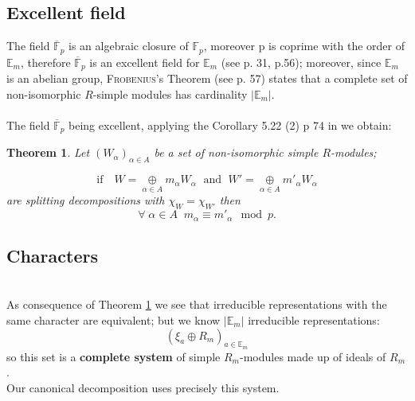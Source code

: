 \documentclass[preprint,12pt,authoryear]{elsarticle}
\newtheorem{thm}{Theorem}[section]
\theoremstyle{definition}
\begin{document}

\subsection{Excellent field}
The field $\overline{\mathbb{F}}_p$ is an algebraic closure of $\mathbb{F}_p$, moreover p is coprime with the
 order of $\mathbb{E}_m$, therefore $\overline{\mathbb{F}}_p$ is an excellent field for $\mathbb{E}_m$ (see \cite{weintraub} p. 31, p.56); moreover, since $\mathbb{E}_m$ is an abelian group, \textsc{Frobenius}'s Theorem (see \cite{weintraub}  p. 57) states that a complete set of non-isomorphic $R$-simple modules has cardinality $|\mathbb{E}_m|$.\\\\

\noindent  The field $\overline{\mathbb{F}}_p$  being excellent, applying the  Corollary 5.22 (2) p 74  in \cite{weintraub} we obtain:


\begin{thm}\label{frobenius} Let $(W_{\alpha})_{\alpha \in A}$ be a set of non-isomorphic simple $R$-modules; 

\[
\textrm{if}\quad  W=\underset{\alpha \in A}{\oplus}m_{\alpha} W_{\alpha}\;  \textrm{ and }\;  W'=\underset{\alpha \in A}{\oplus}m'_{\alpha}W_{\alpha} 
\]
 are splitting decompositions with $\chi_W=\chi_{W'}$
then
\[
\forall \; \alpha \in A \;\; m_{\alpha} \equiv m'_{\alpha}  \mod p.  
\]
\end{thm}


\subsection{Characters}\mbox{}\\
As consequence of Theorem  \ref{frobenius} we see that irreducible representations with the same character are equivalent; but we know $|\mathbb{E}_m|$  
irreducible representations:
 \[
 (\xi_a \oplus R_m)_{a \in \mathbb{E}_m}
 \]
 so this set is a {\bf complete system} of simple $R_m$-modules made up of ideals of $R_m$.\\

Our canonical decomposition uses precisely this system.


\end{document}
